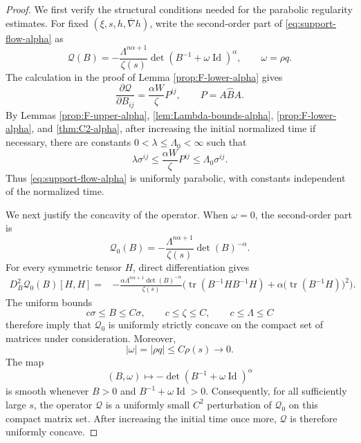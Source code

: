 \documentclass[11pt, reqno]{amsart}
\theoremstyle{remark}
\theoremstyle{definition}
\numberwithin{equation}{section}
\DeclareMathOperator{\tr}{tr}
\newcommand{\Id}{\operatorname{Id}}
\begin{document}
\begin{proof}
We first verify the structural conditions needed for the
parabolic regularity estimates. For fixed
$(\xi,s,h,\overline{\nabla}h)$, write the second-order part of
\eqref{eq:support-flow-alpha} as
\begin{equation*}
    \mathcal Q(B)
    =
    -\frac{\Lambda^{n\alpha+1}}{\zeta(s)}
    \det(B^{-1}+\omega\Id)^\alpha,
    \qquad
    \omega=\rho q.
\end{equation*}
The calculation in the proof of Lemma
\ref{prop:F-lower-alpha} gives
\begin{equation*}
    \frac{\partial\mathcal Q}{\partial B_{ij}}
    =
    \frac{\alpha W}{\zeta}P^{ij},
    \qquad
    P=A\widehat B A.
\end{equation*}
By Lemmas \ref{prop:F-upper-alpha},
\ref{lem:Lambda-bounds-alpha}, \ref{prop:F-lower-alpha}, and
\ref{thm:C2-alpha}, after increasing the initial normalized time
if necessary, there are constants $0<\lambda\leq\Lambda_0<\infty$
such that
\begin{equation}\label{eq:uniform-parabolicity-higher}
    \lambda\sigma^{ij}
    \leq
    \frac{\alpha W}{\zeta}P^{ij}
    \leq
    \Lambda_0\sigma^{ij}.
\end{equation}
Thus \eqref{eq:support-flow-alpha} is uniformly parabolic, with
constants independent of the normalized time.

We next justify the concavity of the operator. When $\omega=0$,
the second-order part is
\begin{equation*}
    \mathcal Q_0(B)
    =
    -\frac{\Lambda^{n\alpha+1}}{\zeta(s)}
    \det(B)^{-\alpha}.
\end{equation*}
For every symmetric tensor $H$, direct differentiation gives
\begin{align*}
    D_B^2\mathcal Q_0(B)[H,H]
    ={}&
    -\frac{\alpha\Lambda^{n\alpha+1}
    \det(B)^{-\alpha}}{\zeta(s)}
    \bigg(
        \tr(B^{-1}HB^{-1}H)  
        +\alpha\big(\tr(B^{-1}H)\big)^2
    \bigg).
\end{align*}
The uniform bounds
\begin{equation*}
    c\sigma\leq B\leq C\sigma,
    \qquad
    c\leq\zeta\leq C,
    \qquad
    c\leq\Lambda\leq C
\end{equation*}
therefore imply that $\mathcal Q_0$ is uniformly strictly
concave on the compact set of matrices under consideration.
Moreover,
\begin{equation*}
    |\omega|=|\rho q|\leq C\rho(s)\longrightarrow0.
\end{equation*}
The map
\begin{equation*}
    (B,\omega)
    \longmapsto
    -\det(B^{-1}+\omega\Id)^\alpha
\end{equation*}
is smooth whenever $B>0$ and $B^{-1}+\omega\Id>0$.
Consequently, for all sufficiently large $s$, the operator
$\mathcal Q$ is a uniformly small $C^2$ perturbation of
$\mathcal Q_0$ on this compact matrix set. After increasing the
initial time once more, $\mathcal Q$ is therefore uniformly
concave.


\end{proof}
\end{document}
